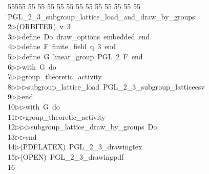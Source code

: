 %
%
\begin{tabbing}
55555 \= 55 \= 55 \= 55 \= 55 \= 55 \= 55 \= 55 \= 55 \= 55 \= 55 \= 55 \= 55 \= \>PGL\_2\_3\_subgroup\_lattice\_load\_and\_draw\_by\_groups:\\[0pt]
2\>$\triangleright$\>(ORBITER)\ v\ 3\ \\[0pt]
3\>$\triangleright$\>$\triangleright$\>define\ Do\ draw\_options\ embedded\ end\ \\[0pt]
4\>$\triangleright$\>$\triangleright$\>define\ F\ finite\_field\ q\ 3\ end\ \\[0pt]
5\>$\triangleright$\>$\triangleright$\>define\ G\ linear\_group\ PGL\ 2\ F\ end\ \\[0pt]
6\>$\triangleright$\>$\triangleright$\>with\ G\ do\ \\[0pt]
7\>$\triangleright$\>$\triangleright$\>group\_theoretic\_activity\ \\[0pt]
8\>$\triangleright$\>$\triangleright$\>$\triangleright$\>subgroup\_lattice\_load\ PGL\_2\_3\_subgroup\_latticecsv\ \\[0pt]
9\>$\triangleright$\>$\triangleright$\>end\ \\[0pt]
10\>$\triangleright$\>$\triangleright$\>with\ G\ do\ \\[0pt]
11\>$\triangleright$\>$\triangleright$\>group\_theoretic\_activity\ \\[0pt]
12\>$\triangleright$\>$\triangleright$\>$\triangleright$\>subgroup\_lattice\_draw\_by\_groups\ Do\ \\[0pt]
13\>$\triangleright$\>$\triangleright$\>end\\[0pt]
14\>$\triangleright$\>(PDFLATEX)\ PGL\_2\_3\_drawingtex\\[0pt]
15\>$\triangleright$\>(OPEN)\ PGL\_2\_3\_drawingpdf\\[0pt]
16\>\end{tabbing}
